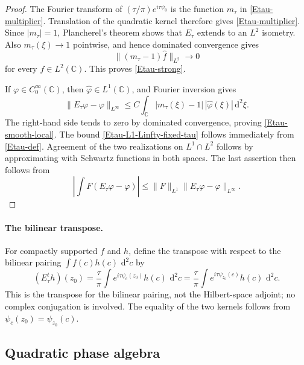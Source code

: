 \documentclass[a4paper,11pt]{article}
\newcommand{\C}{\mathbb{C}}
\newcommand{\dd}{\,\text{d}}
\theoremstyle{plain}
\theoremstyle{definition}
\theoremstyle{remark}
\begin{document}
\begin{proof}
The Fourier transform of $(\tau/\pi)e^{i\tau\psi_0}$ is the function
$m_\tau$ in \eqref{Etau-multiplier}.  Translation of the quadratic kernel
therefore gives \eqref{Etau-multiplier}.  Since $|m_\tau|=1$, Plancherel's
theorem shows that $E_\tau$ extends to an $L^2$ isometry.  Also
$m_\tau(\xi)\to1$ pointwise, and hence dominated convergence gives
\begin{equation*}
        \|(m_\tau-1)\widehat f\|_{L^2}\longrightarrow0
\end{equation*}
for every $f\in L^2(\C)$.  This proves \eqref{Etau-strong}.

If $\varphi\in C_0^\infty(\C)$, then $\widehat\varphi\in L^1(\C)$, and Fourier
inversion gives
\begin{equation*}
        \|E_\tau\varphi-\varphi\|_{L^\infty}
        \le C\int_{\C}|m_\tau(\xi)-1|\,|\widehat\varphi(\xi)|\dd^2\xi.
\end{equation*}
The right-hand side tends to zero by dominated convergence, proving
\eqref{Etau-smooth-local}.  The bound \eqref{Etau-L1-Linfty-fixed-tau} follows immediately from
\eqref{Etau-def}.  Agreement of the two realizations on $L^1\cap L^2$ follows
by approximating with Schwartz functions in both spaces.  The last assertion
then follows from
\begin{equation*}
        \left|\int F(E_\tau\varphi-\varphi)\right|
        \le \|F\|_{L^1}\|E_\tau\varphi-\varphi\|_{L^\infty}.
\end{equation*}
\end{proof}


\paragraph{The bilinear transpose.}
For compactly supported $f$ and $h$, define the transpose with respect to the bilinear pairing
$\int f(c)h(c)\,\dd^2c$ by
\begin{equation}\label{Etau-transpose-def}
        (E_\tau^t h)(z_0)
        =\frac{\tau}{\pi}\int e^{i\tau\psi_c(z_0)}h(c)\,\dd^2c
        =\frac{\tau}{\pi}\int e^{i\tau\psi_{z_0}(c)}h(c)\,\dd^2c .
\end{equation}
This is the transpose for the bilinear pairing, not the Hilbert-space adjoint; no complex conjugation is involved.  The equality of the two kernels follows from $\psi_c(z_0)=\psi_{z_0}(c)$.

\subsection{Quadratic phase algebra}
\end{document}
